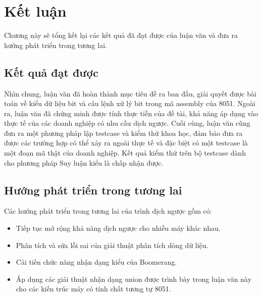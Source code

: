 \chapter{Kết luận}

Chương này sẽ tổng kết lại các kết quả đã đạt được của luận văn và đưa ra hướng phát triển trong tương lai.

\section{Kết quả đạt được}

Nhìn chung, luận văn đã hoàn thành mục tiêu đề ra ban đầu, giải quyết được bài toán về kiểu dữ liệu bit và câu lệnh xử lý bit trong mã assembly của 8051. Ngoài ra, luận văn đã chứng minh được tính thực tiễn của đề tài, khả năng áp dụng vào thực tế của các doanh nghiệp có nhu cầu dịch ngược. Cuối cùng, luận văn cũng đưa ra một phương pháp lập testcase và kiểm thử khoa học, đảm bảo đưa ra được các trường hợp có thể xảy ra ngoài thực tế và đặc biệt có một testcase là một đoạn mã thật của doanh nghiệp. Kết quả kiểm thử trên bộ testcase dành cho phương pháp Suy luận kiểu là chấp nhận được.

\section{Hướng phát triển trong tương lai}

Các hướng phát triển trong tương lai của trình dịch ngược gồm có:

\begin{itemize}
	\item Tiếp tục mở rộng khả năng dịch ngược cho nhiều máy khác nhau.
	\item Phân tích và sửa lỗi sai của giải thuật phân tích dòng dữ liệu.
	\item Cải tiến chức năng nhận dạng kiểu của Boomerang.
	\item Áp dụng các giải thuật nhận dạng union được trình bày trong luận văn này cho các kiến trúc máy có tính chất tương tự 8051.
\end{itemize}
